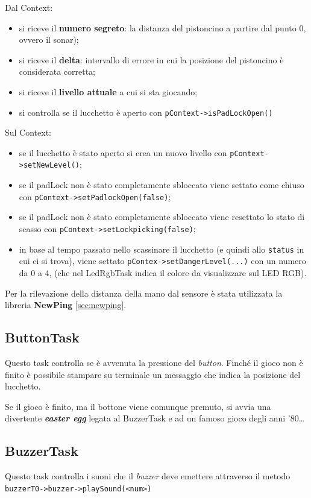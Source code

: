 Dal Context:
\begin{itemize}
	\item si riceve il \textbf{numero segreto}: la distanza del pistoncino a partire dal punto 0, ovvero il sonar);
	\item si riceve il \textbf{delta}: intervallo di errore in cui la posizione del pistoncino è considerata corretta;
	\item si riceve il \textbf{livello attuale} a cui si sta giocando;
	\item si controlla se il lucchetto è aperto con \texttt{pContext->isPadLockOpen()}
\end{itemize}
Sul Context:
\begin{itemize}
	\item se il lucchetto è stato aperto si crea un nuovo livello con \texttt{pContext->setNewLevel()};
	\item se il padLock non è stato completamente sbloccato viene settato come chiuso con \texttt{pContext->setPadlockOpen(false)};
	\item se il padLock non è stato completamente sbloccato viene resettato lo stato di scasso con \texttt{pContext->setLockpicking(false)};
	\item in base al tempo passato nello scassinare il lucchetto (e quindi allo \texttt{status} in cui ci si trova), viene settato \texttt{pContex->setDangerLevel(...)} con un numero da 0 a 4, (che nel LedRgbTask indica il colore da visualizzare sul LED RGB).
\end{itemize}
Per la rilevazione della distanza della mano dal sensore è stata utilizzata la libreria \textbf{NewPing} \ref{sec:newping}.


\subsection{ButtonTask}
Questo task controlla se è avvenuta la pressione del \textit{button}.
Finché il gioco non è finito è possibile stampare su terminale un messaggio che indica la posizione del lucchetto. 

Se il gioco è finito, ma il bottone viene comunque premuto, si avvia una divertente \textbf{\textit{easter egg}} legata al BuzzerTask e ad un famoso gioco degli anni '80\dots


\subsection{BuzzerTask}
Questo task controlla i suoni che il \textit{buzzer} deve emettere attraverso il metodo \texttt{buzzerT0->buzzer->playSound(<num>)}

